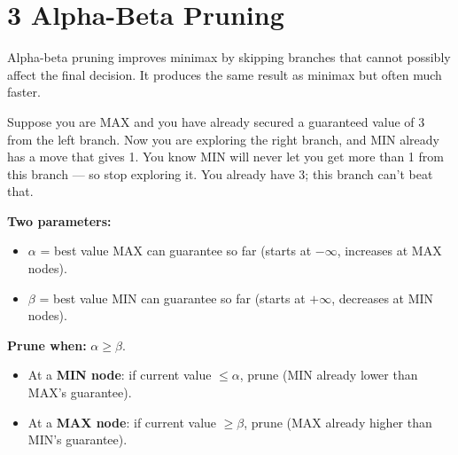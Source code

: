 \documentclass[a4paper,11pt]{article}
\begin{document}
\section{3 \quad Alpha-Beta Pruning}

Alpha-beta pruning improves minimax by skipping branches that cannot possibly affect the final decision. It produces the same result as minimax but often much faster.

\begin{intuition}
Suppose you are MAX and you have already secured a guaranteed value of 3 from the left branch. Now you are exploring the right branch, and MIN already has a move that gives 1. You know MIN will never let you get more than 1 from this branch — so stop exploring it. You already have 3; this branch can't beat that.
\end{intuition}

\textbf{Two parameters:}
\begin{itemize}
  \item $\alpha$ = best value MAX can guarantee so far (starts at $-\infty$, increases at MAX nodes).
  \item $\beta$ = best value MIN can guarantee so far (starts at $+\infty$, decreases at MIN nodes).
\end{itemize}

\textbf{Prune when:} $\alpha \geq \beta$.
\begin{itemize}
  \item At a \textbf{MIN node}: if current value $\leq \alpha$, prune (MIN already lower than MAX's guarantee).
  \item At a \textbf{MAX node}: if current value $\geq \beta$, prune (MAX already higher than MIN's guarantee).
\end{itemize}
\end{document}
